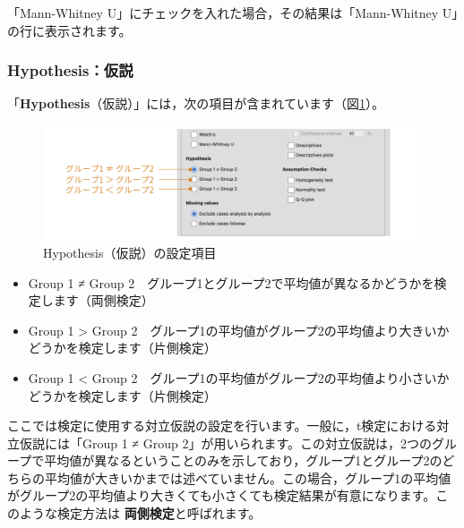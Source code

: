 \documentclass[
  12pt,
  a5jpaper,
  lualatex, ja=standard]{bxjsbook}
\providecommand{\tightlist}{%
  \setlength{\itemsep}{0pt}\setlength{\parskip}{0pt}}
\renewcommand{\emph}[1]{\textbf{\color{emph} #1}}
\newenvironment{jmvsettings}{%
	\begin{center}%
	\begin{tcolorbox}[%
		title=設定項目,
		colframe=gmoji,
		colbacktitle=gmoji,
		colback=gmoji!2!white,
		breakable,
		width=.9\textwidth,
		]\small\addtolength{\leftmargini}{-3\labelsep}%
	}%
	{\end{tcolorbox}\end{center}}
\begin{document}
「Mann-Whitney U」にチェックを入れた場合，その結果は「Mann-Whitney U」の行に表示されます。

\hypertarget{subsub:ttest-hypothesis}{%
\subsubsection*{Hypothesis：仮説}\label{subsub:ttest-hypothesis}}

「\textbf{Hypothesis}（仮説）」には，次の項目が含まれています（図\ref{fig:ttests-hypothesis}）。

\begin{figure}[!ht]

{\centering \includegraphics[width=1\linewidth]{images/ttests/hypothesis} 

}

\caption{Hypothesis（仮説）の設定項目}\label{fig:ttests-hypothesis}
\end{figure}

\begin{jmvsettings}

\begin{itemize}
\tightlist
\item
  Group 1 ≠ Group 2　グループ1とグループ2で平均値が異なるかどうかを検定します（両側検定）
\item
  Group 1 \textgreater{} Group 2　グループ1の平均値がグループ2の平均値より大きいかどうかを検定します（片側検定）
\item
  Group 1 \textless{} Group 2　グループ1の平均値がグループ2の平均値より小さいかどうかを検定します（片側検定）
\end{itemize}

\end{jmvsettings}

ここでは検定に使用する対立仮説の設定を行います。一般に，t検定における対立仮説には「Group 1 ≠ Group 2」が用いられます。この対立仮説は，2つのグループで平均値が異なるということのみを示しており，グループ1とグループ2のどちらの平均値が大きいかまでは述べていません。この場合，グループ1の平均値がグループ2の平均値より大きくても小さくても検定結果が有意になります。このような検定方法は\emph{両側検定}と呼ばれます。
\end{document}
